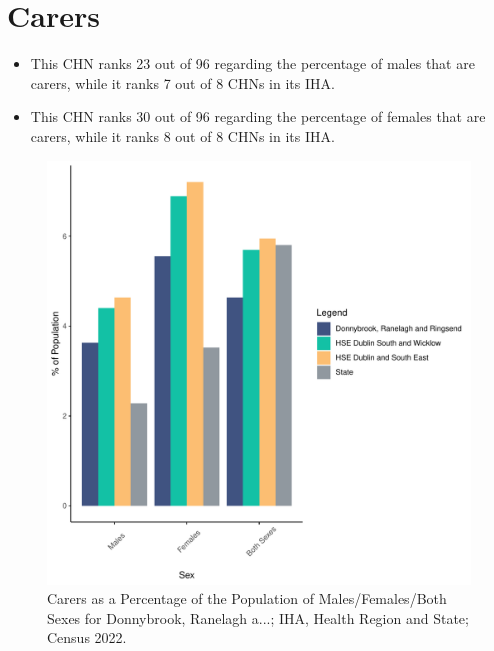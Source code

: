 \documentclass{article}
\begin{document}
\section{Carers}\label{sect:Carers}
\begin{itemize}
\item This CHN ranks  23 out of 96 regarding the percentage of males that are carers, while it ranks   7 out of 8 CHNs in its IHA.
\item This CHN ranks  30 out of 96 regarding the percentage of females that are carers, while it ranks   8 out of 8 CHNs in its IHA.
\end{itemize}
\begin{figure}[H]
	\centering
	\includegraphics[width = 150mm]{../figures/CareED.pdf}
	\caption{Carers as a Percentage of the Population of Males/Females/Both Sexes for Donnybrook, Ranelagh a...; IHA, Health Region and State; Census 2022.}
	\label{fig:2ae19629-1a6a-13a3-e055-000000000001}
	\end{figure}
\end{document}
